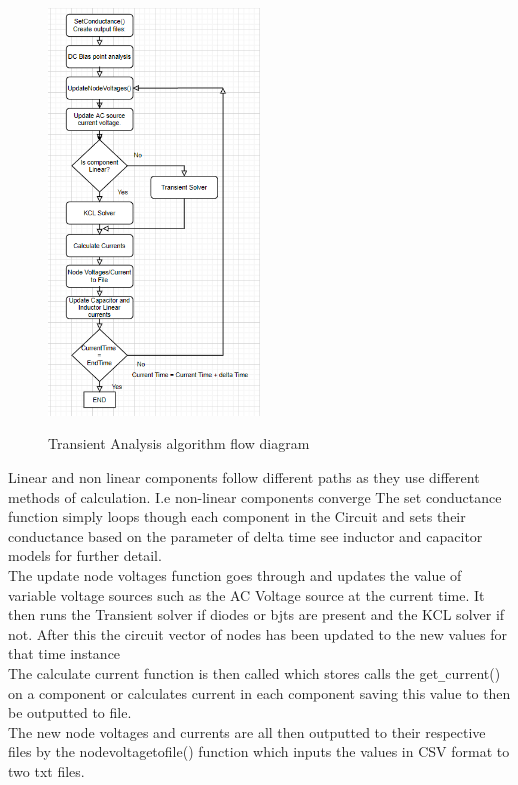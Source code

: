 \documentclass{article}
\begin{document}
\begin{figure}[H]
\centering
\includegraphics[width =0.5\textwidth]{ images/TranAna.PNG}
\label{fig:TranAna} 
\caption{Transient Analysis algorithm flow diagram}
\end{figure}
Linear and non linear components follow different paths as they use different methods of calculation. I.e non-linear components converge
\smallbreak
The set conductance function simply loops though each component in the Circuit and sets their conductance based on the parameter of delta time see inductor and capacitor models for further detail.\\
The update node voltages function goes through and updates the value of variable voltage sources such as the AC Voltage source at the current time. It then runs the Transient solver if diodes or bjts are present and the KCL solver if not. 
After this the circuit vector of nodes has been updated to the new values for that time instance\\
The calculate current function is then called which stores calls the get\verb|_|current() on a component or calculates current in each component saving this value to then be outputted to file.   \\
The new node voltages and currents are all then outputted to their respective files by the nodevoltagetofile()  function which inputs the values in CSV format to two txt files.\\
\end{document}
